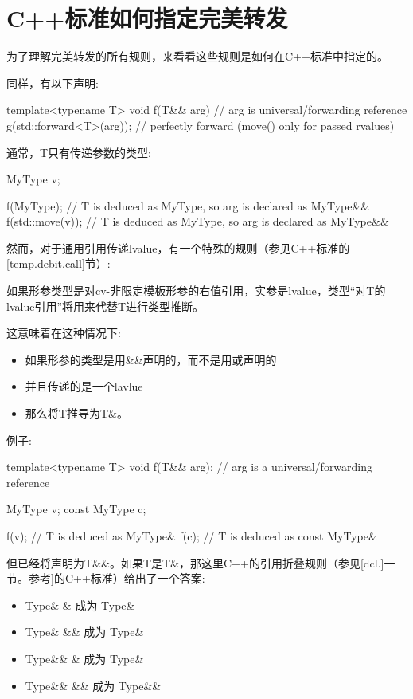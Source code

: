 \section{C++标准如何指定完美转发}
为了理解完美转发的所有规则，来看看这些规则是如何在C++标准中指定的。

同样，有以下声明:

\begin{cppcode}
template<typename T>
void f(T&& arg) // arg is universal/forwarding reference
{
	g(std::forward<T>(arg)); // perfectly forward (move() only for passed rvalues)
}
\end{cppcode}

通常，T只有传递参数的类型:

\begin{cppcode}
MyType v;

f(MyType{}); // T is deduced as MyType, so arg is declared as MyType&&
f(std::move(v)); // T is deduced as MyType, so arg is declared as MyType&&
\end{cppcode}

然而，对于通用引用传递lvalue，有一个特殊的规则（参见C++标准的[temp.debit.call]节）:

如果形参类型是对cv-非限定模板形参的右值引用，实参是lvalue，类型“对T的lvalue引用”将用来代替T进行类型推断。



这意味着在这种情况下:

\begin{itemize}
	\item 如果形参的类型是用\&\&声明的，而不是用或声明的
	\item 并且传递的是一个lavlue
	\item 那么将T推导为T\&。
\end{itemize}

例子:

\begin{cppcode}
template<typename T>
void f(T&& arg); // arg is a universal/forwarding reference

MyType v;
const MyType c;

f(v); // T is deduced as MyType&
f(c); // T is deduced as const MyType&
\end{cppcode}

但已经将声明为T\&\&。如果T是T\&，那这里C++的引用折叠规则（参见[dcl.]一节。参考]的C++标准）给出了一个答案:

\begin{itemize}
	\item Type\& \& 成为 Type\&
	\item Type\& \&\& 成为 Type\&
	\item Type\&\& \& 成为 Type\&
	\item Type\&\& \&\& 成为 Type\&\&
\end{itemize}

